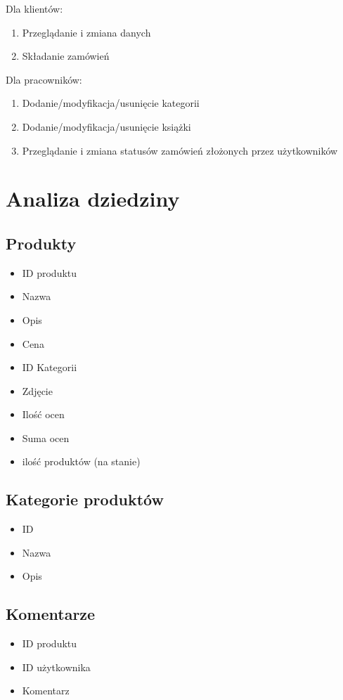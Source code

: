 \documentclass[pdflatex,11pt]{aghdpl}
\begin{document}
Dla klientów:
\begin{enumerate}
\item Przeglądanie i zmiana danych
\item Składanie zamówień
\end{enumerate}

Dla pracowników:
\begin{enumerate}
\item Dodanie/modyfikacja/usunięcie kategorii
\item Dodanie/modyfikacja/usunięcie książki
\item Przeglądanie i zmiana statusów zamówień złożonych przez użytkowników
\end{enumerate}



\chapter{Analiza dziedziny}

\section{Produkty}
\begin{itemize}
\item ID produktu
\item Nazwa
\item Opis
\item Cena
\item ID Kategorii
\item Zdjęcie
\item Ilość ocen
\item Suma ocen
\item ilość produktów (na stanie)
\end{itemize}

\section{Kategorie produktów}
\begin{itemize}
\item ID
\item Nazwa
\item Opis
\end{itemize}

\section{Komentarze}
\begin{itemize}
\item ID produktu
\item ID użytkownika
\item Komentarz
\end{itemize}
\end{document}
